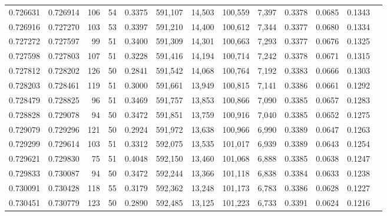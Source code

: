 \begin{tabular}{rrrrrrrrrrrrr}
0.726631 & 0.726914 &   106 &  54 &                                     0.3375 & 591,107 &  14,503 & 100,559 &   7,397 & 0.3378 & 0.0685 & 0.1343 \\
0.726916 & 0.727270 &   103 &  53 &                                     0.3397 & 591,210 &  14,400 & 100,612 &   7,344 & 0.3377 & 0.0680 & 0.1334 \\
0.727272 & 0.727597 &    99 &  51 &                                     0.3400 & 591,309 &  14,301 & 100,663 &   7,293 & 0.3377 & 0.0676 & 0.1325 \\
0.727598 & 0.727803 &   107 &  51 &                                     0.3228 & 591,416 &  14,194 & 100,714 &   7,242 & 0.3378 & 0.0671 & 0.1315 \\
0.727812 & 0.728202 &   126 &  50 &                                     0.2841 & 591,542 &  14,068 & 100,764 &   7,192 & 0.3383 & 0.0666 & 0.1303 \\
0.728203 & 0.728461 &   119 &  51 &                                     0.3000 & 591,661 &  13,949 & 100,815 &   7,141 & 0.3386 & 0.0661 & 0.1292 \\
0.728479 & 0.728825 &    96 &  51 &                                     0.3469 & 591,757 &  13,853 & 100,866 &   7,090 & 0.3385 & 0.0657 & 0.1283 \\
0.728828 & 0.729078 &    94 &  50 &                                     0.3472 & 591,851 &  13,759 & 100,916 &   7,040 & 0.3385 & 0.0652 & 0.1275 \\
0.729079 & 0.729296 &   121 &  50 &                                     0.2924 & 591,972 &  13,638 & 100,966 &   6,990 & 0.3389 & 0.0647 & 0.1263 \\
0.729299 & 0.729614 &   103 &  51 &                                     0.3312 & 592,075 &  13,535 & 101,017 &   6,939 & 0.3389 & 0.0643 & 0.1254 \\
0.729621 & 0.729830 &    75 &  51 &                                     0.4048 & 592,150 &  13,460 & 101,068 &   6,888 & 0.3385 & 0.0638 & 0.1247 \\
0.729833 & 0.730087 &    94 &  50 &                                     0.3472 & 592,244 &  13,366 & 101,118 &   6,838 & 0.3384 & 0.0633 & 0.1238 \\
0.730091 & 0.730428 &   118 &  55 &                                     0.3179 & 592,362 &  13,248 & 101,173 &   6,783 & 0.3386 & 0.0628 & 0.1227 \\
0.730451 & 0.730779 &   123 &  50 &                                     0.2890 & 592,485 &  13,125 & 101,223 &   6,733 & 0.3391 & 0.0624 & 0.1216 \\

\end{tabular}

